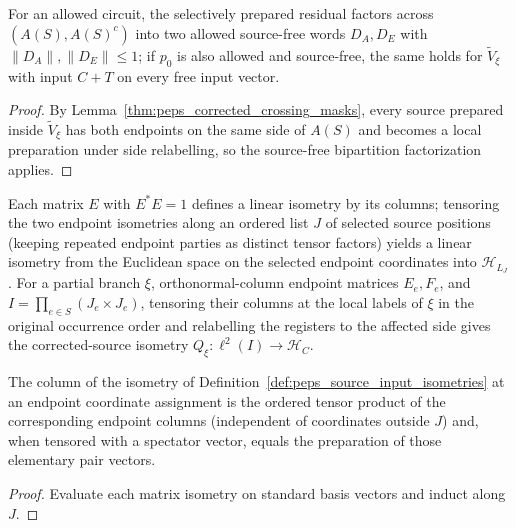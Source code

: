\begin{lemma}
    \label{thm:peps_reordered_local_factors}
    \leanok
    For an allowed circuit, the
    selectively prepared residual factors across $(A(S),A(S)^c)$ into two allowed source-free words $D_A,D_E$ with
    $\|D_A\|,\|D_E\|\le1$; if $p_0$ is also allowed and source-free, the same holds for $\widetilde V_\xi$ with input $C+T$ on every free input vector.
\end{lemma}
\begin{proof}
    \leanok
    By Lemma~\ref{thm:peps_corrected_crossing_masks}, every source prepared inside $\widetilde V_\xi$ has both endpoints on the same side of $A(S)$ and becomes a local preparation under side relabelling, so the source-free bipartition factorization applies.
\end{proof}

\begin{definition}
    \label{def:peps_source_input_isometries}
    \leanok
    Each matrix $E$ with $E^*E=1$ defines a linear isometry by its columns; tensoring the two endpoint isometries along an ordered list $J$ of selected source positions (keeping repeated endpoint parties as distinct tensor factors) yields a linear isometry from the Euclidean space on the selected endpoint coordinates into $\mathcal H_{L_J}$.
    For a partial branch $\xi$, orthonormal-column endpoint matrices $E_e,F_e$,
    and $I=\prod_{e\in S}(J_e\times J_e)$, tensoring their columns at the local
    labels of $\xi$ in the original occurrence order and relabelling the
    registers to the affected side gives the corrected-source isometry
    $Q_\xi\colon\ell^2(I)\to\mathcal H_C$.
\end{definition}

\begin{lemma}
    \label{thm:peps_source_input_columns}
    \leanok
    The column of the isometry of Definition~\ref{def:peps_source_input_isometries} at an endpoint coordinate assignment is the ordered tensor product of the corresponding endpoint columns (independent of coordinates outside $J$) and, when tensored with a spectator vector, equals the preparation of those elementary pair vectors.
\end{lemma}
\begin{proof}
    \leanok
    Evaluate each matrix isometry on standard basis vectors and induct along $J$.
\end{proof}


